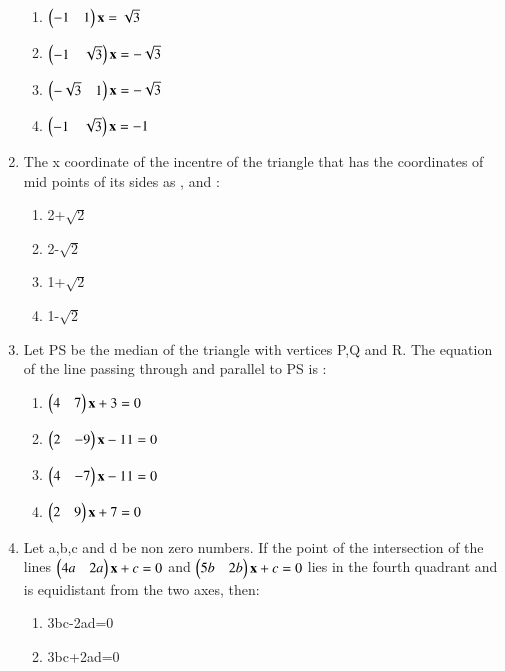 \begin{enumerate}
    \begin{enumerate}
     \item  $\begin{pmatrix}-1 & 1\end{pmatrix}\mathbf{x} = \sqrt3$
     \item  $\begin{pmatrix}-1 & \sqrt3\end{pmatrix}\mathbf{x} = -\sqrt3$
     \item  $\begin{pmatrix}-\sqrt3 & 1\end{pmatrix}\mathbf{x} = -\sqrt3$
     \item  $\begin{pmatrix}-1 & \sqrt3\end{pmatrix}\mathbf{x} = -1$\\
     \end{enumerate}
    \item The x coordinate of the incentre of the triangle that has the coordinates of mid points of its sides as , and :\\
    \begin{enumerate}
     \item  2+$\sqrt2$
     \item  2-$\sqrt2$
     \item  1+$\sqrt2$
     \item  1-$\sqrt2$\\
     \end{enumerate}
    \item Let PS be the median of the triangle with vertices P,Q and R. The equation of the line passing through  and parallel to PS is :
    \begin{enumerate}
     \item  $\begin{pmatrix}4 & 7\end{pmatrix}\mathbf{x} + 3 = 0$
     \item  $\begin{pmatrix}2 & -9\end{pmatrix}\mathbf{x} - 11 = 0$
     \item  $\begin{pmatrix}4 & -7\end{pmatrix}\mathbf{x} - 11 = 0$
     \item  $\begin{pmatrix}2 & 9\end{pmatrix}\mathbf{x} + 7 = 0$
     \end{enumerate}
    \item Let a,b,c and d be non zero numbers. If the point of the intersection of the lines $\begin{pmatrix}4a & 2a\end{pmatrix}\mathbf{x} + c = 0$ and $\begin{pmatrix}5b & 2b\end{pmatrix}\mathbf{x} + c = 0$ lies in the fourth quadrant and is equidistant from the two axes, then:\\
    \begin{enumerate}
     \item  3bc-2ad=0
     \item  3bc+2ad=0

\end{enumerate}
\end{enumerate}
